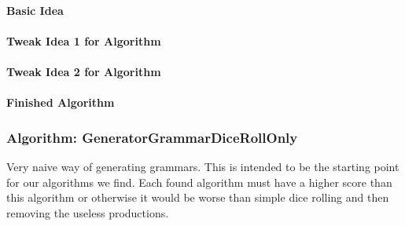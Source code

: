\paragraph{Basic Idea}

\paragraph{Tweak Idea 1 for Algorithm}

\paragraph{Tweak Idea 2 for Algorithm}

\paragraph{Finished Algorithm}



\pagebreak

\subsubsection{Algorithm: GeneratorGrammarDiceRollOnly}
\noindent Very naive way of generating grammars. This is intended to be the starting point for our algorithms we find. Each found algorithm must have a higher score than this algorithm or otherwise it would be worse than simple dice rolling and then removing the useless productions.\\

